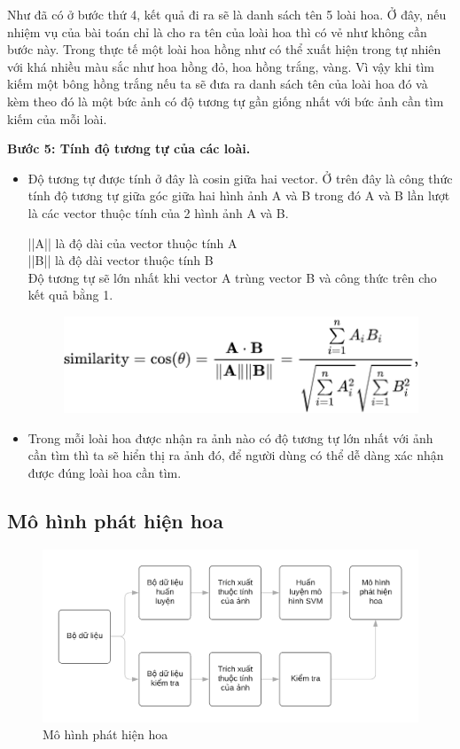 \documentclass[12pt]{report}
\begin{document}
		Như đã có ở bước thứ 4, kết quả đi ra sẽ là danh sách tên 5 loài hoa. Ở đây, nếu nhiệm vụ của bài toán chỉ là cho ra tên của loài hoa thì có vẻ như không cần bước này. Trong thực tế một loài hoa hồng như có thể xuất hiện trong tự nhiên với khá nhiều màu sắc như hoa hồng đỏ, hoa hồng trắng, vàng. Vì vậy khi tìm kiếm một bông hồng trắng nếu ta sẽ đưa ra danh sách tên của loài hoa đó và kèm theo đó là một bức ảnh có độ tương tự gần giống nhất với bức ảnh cần tìm kiếm của mỗi loài.
												
		\textbf{Bước 5: Tính độ tương tự của các loài.} 
		\begin{itemize}
			\item Độ tương tự được tính ở đây là cosin giữa hai vector.
			      Ở trên đây là công thức tính độ tương tự giữa góc giữa hai hình ảnh A và B trong đó A và B lần lượt là các vector thuộc tính của 2 hình ảnh A và B. 
			      			      			      			      			      			
			      ||A|| là độ dài của vector thuộc tính A\\
			      ||B|| là độ dài vector thuộc tính B\\
			      Độ tương tự sẽ lớn nhất khi vector A trùng vector B và công thức trên cho kết quả bằng 1.
			      \begin{figure}[h]
			      	\centering
			      	\includegraphics[scale=0.8]{cosin}
			      \end{figure}
			\item Trong mỗi loài hoa được nhận ra ảnh nào có độ tương tự lớn nhất với ảnh cần tìm thì ta sẽ hiển thị ra ảnh đó, để người dùng có thể dễ dàng xác nhận được đúng loài hoa cần tìm.
		\end{itemize}	
														
		\subsection{Mô hình phát hiện hoa}
		\begin{figure}[h]
			\centering
			\includegraphics[scale=0.4]{mohinh_phathien}
			\caption{Mô hình phát hiện hoa}
			\label{fig:mohinh_phathien}
		\end{figure}
										
\end{document}
